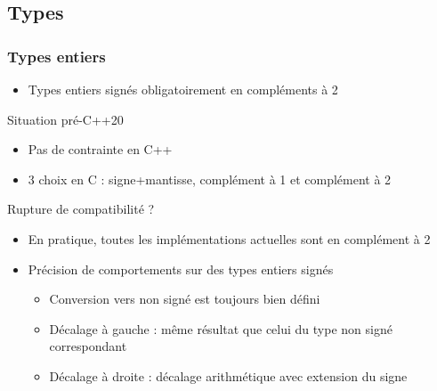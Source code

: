 \documentclass[C++.tex]{subfiles}
\begin{document}
\subsection*{Types}
\begin{frame}[fragile]
	\frametitle{Types entiers}
	\begin{itemize}
		\item Types entiers signés obligatoirement en compléments à 2
	\end{itemize}

	\begin{block}{Situation pré-C++20}
		\begin{itemize}
			\item Pas de contrainte en C++
			\item 3 choix en C : signe+mantisse, complément à 1 et complément à 2
		\end{itemize}
	\end{block}


	\begin{alertblock}{Rupture de compatibilité ?}
		\begin{itemize}
			\item En pratique, toutes les implémentations actuelles sont en complément à 2
		\end{itemize}
	\end{alertblock}

	\begin{itemize}
		\item Précision de comportements sur des types entiers signés
		\begin{itemize}
			\item Conversion vers non signé est toujours bien défini


			\item Décalage à gauche : même résultat que celui du type non signé correspondant
			\item Décalage à droite : décalage arithmétique avec extension du signe
		\end{itemize}
	\end{itemize}
\end{frame}
\end{document}
